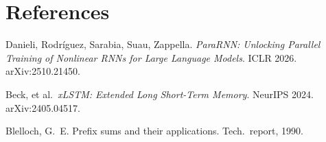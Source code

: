 \documentclass[11pt]{article}
\theoremstyle{plain}
\begin{document}
\section{References}

Danieli, Rodríguez, Sarabia, Suau, Zappella.
\textit{ParaRNN: Unlocking Parallel Training of Nonlinear RNNs for Large Language Models}.
ICLR 2026. arXiv:2510.21450.

Beck, et al.\ \textit{xLSTM: Extended Long Short-Term Memory}. NeurIPS 2024.
arXiv:2405.04517.

Blelloch, G.~E. Prefix sums and their applications. Tech.\ report, 1990.
\end{document}
